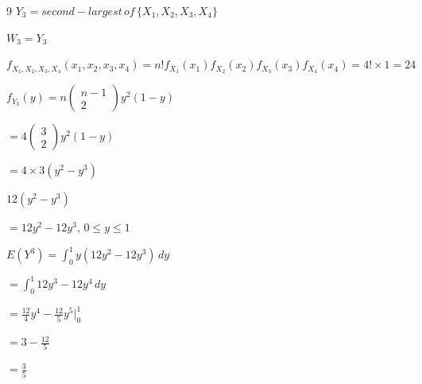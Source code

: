 \documentclass[12 pt]{article}
\begin{document}
\begin{exercise}{9}
    $Y_3 = second-largest \, of \, \{ X_1, X_2, X_3, X_4 \}$

    $W_3 = Y_3$

    \hfill

    $f_{X_1, X_2, X_3, X_4} (x_1, x_2, x_3, x_4) = n! f_{X_1}(x_1) f_{X_2}(x_2) f_{X_3}(x_3) f_{X_4}(x_4) = 4! \times 1 = 24$

    $f_{Y_3} (y) = n \begin{pmatrix}
        n - 1 \\
        2
    \end{pmatrix} y^2 (1-y)$

    $= 4 \begin{pmatrix}
        3 \\
        2
    \end{pmatrix} y^2 (1-y)$

    $= 4 \times 3 (y^2 - y^3)$

    $12(y^2 - y^3)$

    $= 12y^2 - 12y^3, \, 0 \leq y \leq 1$

    $E(Y^3) = \int_{0}^{1} y(12y^2 - 12y^3) \, dy$

    $= \int_{0}^{1} 12y^3 - 12y^4 \, dy$

    $ = \frac{12}{4}y^4 - \frac{12}{5}y^5 |_{0}^{1}$

    $ = 3 - \frac{12}{5}$

    $ = \frac{3}{5}$

    \hfill
    \end{exercise}
\end{document}
